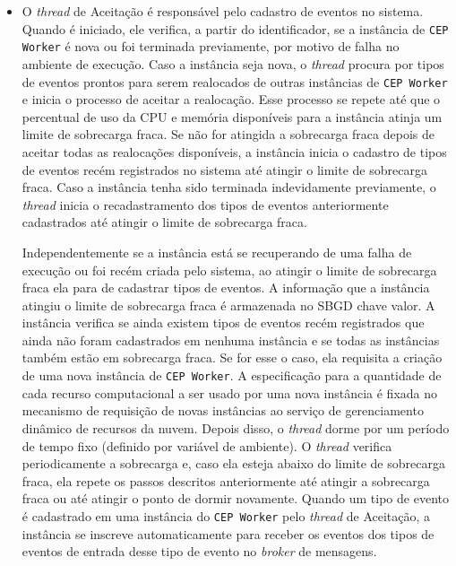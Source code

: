 \begin{itemize}
   
\item O \textit{thread} de Aceitação é responsável pelo cadastro de eventos no sistema. Quando é iniciado, ele verifica, a partir do identificador, se a instância de \texttt{CEP Worker} é nova ou foi terminada previamente, por motivo de falha no ambiente de execução. Caso a instância seja nova, o \textit{thread} procura por tipos de eventos prontos para serem realocados de outras instâncias de \texttt{CEP Worker} e inicia o processo de aceitar a realocação. Esse processo se repete até que o percentual de uso da CPU e memória disponíveis para a instância atinja um limite de sobrecarga fraca. Se não for atingida a sobrecarga fraca depois de aceitar todas as realocações disponíveis, a instância inicia o cadastro de tipos de eventos recém registrados no sistema até atingir o limite de sobrecarga fraca. Caso a instância tenha sido terminada indevidamente previamente, o \textit{thread} inicia o recadastramento dos tipos de eventos  anteriormente cadastrados até atingir o limite de sobrecarga fraca.

Independentemente se a instância está se recuperando de uma falha de execução ou foi recém criada pelo sistema, ao atingir o limite de sobrecarga fraca ela para de cadastrar tipos de eventos. A informação que a instância atingiu o limite de sobrecarga fraca é armazenada no SBGD chave valor. A instância verifica se ainda existem tipos de eventos recém registrados que ainda não foram cadastrados em nenhuma instância e se todas as instâncias também estão em sobrecarga fraca. Se for esse o caso, ela requisita a criação de uma nova instância de \texttt{CEP Worker}. A especificação para a quantidade de cada recurso computacional a ser usado por uma nova instância é fixada no mecanismo de requisição de novas instâncias ao serviço de gerenciamento dinâmico de recursos da nuvem. Depois disso, o \textit{thread} dorme por um período de tempo fixo (definido por variável de ambiente).
O \textit{thread} verifica periodicamente a sobrecarga e, caso ela esteja abaixo do limite de sobrecarga fraca, ela repete os passos descritos anteriormente até atingir a sobrecarga fraca ou até atingir o ponto de dormir novamente. Quando um tipo de evento é cadastrado em uma instância do \texttt{CEP Worker} pelo \textit{thread} de Aceitação, a instância se inscreve automaticamente para receber os eventos dos tipos de eventos de entrada desse tipo de evento no \textit{broker} de mensagens.



\end{itemize}
